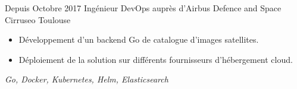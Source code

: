 \cventry
    {Depuis Octobre 2017}
    {Ingénieur DevOps auprès d'Airbus Defence and Space}
    {}
    {Cirruseo}
    {Toulouse}
    {
        \begin{itemize}
            \item Développement d'un backend Go de catalogue d'images satellites.
            \item Déploiement de la solution sur différents fournisseurs d'hébergement cloud.
        \end{itemize}
        \textit{Go, Docker, Kubernetes, Helm, Elasticsearch}
    }